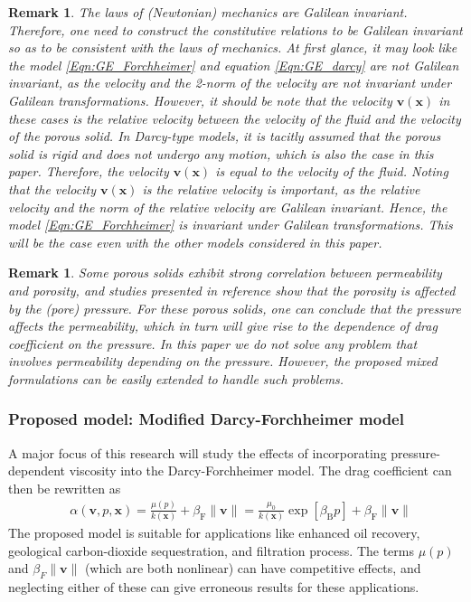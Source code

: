 \documentclass[11pt,reqno]{amsart}
\newtheorem{remark}[theorem]{Remark}
\begin{document}
\begin{remark}
  The laws of (Newtonian) mechanics are Galilean 
  invariant. Therefore, one need to construct the 
  constitutive relations to be Galilean invariant 
  so as to be consistent with the laws of mechanics. 
At first glance, it may look like the model 
  \eqref{Eqn:GE_Forchheimer} and equation 
  \eqref{Eqn:GE_darcy} are not Galilean invariant, 
  as the velocity and the 2-norm of the velocity 
  are not invariant under Galilean transformations. 
However, it should be note that the velocity 
  $\mathbf{v}(\mathbf{x})$ in these cases is 
  the relative velocity between the velocity 
  of the fluid and the velocity of the porous 
  solid. In Darcy-type models, it is tacitly 
  assumed that the porous solid is rigid and 
  does not undergo any motion, which is also 
  the case in this paper. Therefore, the 
  velocity $\mathbf{v}(\mathbf{x})$ is 
  equal to the velocity of the fluid. 
Noting that the velocity $\mathbf{v}(\mathbf{x})$ 
  is the relative velocity is important, as the 
  relative velocity and the norm of the relative 
  velocity are Galilean invariant. Hence, the model 
  \eqref{Eqn:GE_Forchheimer} is invariant under 
  Galilean transformations. This will be the case 
  even with the other models considered in this 
  paper.
\end{remark}

\begin{remark}
  Some porous solids exhibit strong correlation between 
  permeability and porosity, and studies presented in 
  reference \cite{PhysRevA.46.7680} show that the 
  porosity is affected by the (pore) pressure. For 
  these porous solids, one can conclude that the 
  pressure affects the permeability, which in turn 
  will give rise to the dependence of drag coefficient 
  on the pressure. In this paper we do not solve any 
  problem that involves permeability depending on the 
  pressure. However, the proposed mixed formulations 
  can be easily extended to handle such problems. 
\end{remark}

\subsubsection{Proposed model: Modified Darcy-Forchheimer model}
A major focus of this research will study the effects 
of incorporating pressure-dependent viscosity into 
the Darcy-Forchheimer model. The drag coefficient 
can then be rewritten as
\begin{align}
  \label{Eqn:GE_ModifiedForchheimer}
  &\alpha(\mathbf{v},p,\mathbf{x}) =  \frac{\mu(p)}{k(\mathbf{x})} 
  + \beta_{\mathrm{F}}\|\mathbf{v}\| = \frac{\mu_0}{k(\mathbf{x})} 
  \exp[\beta_{\mathrm{B}} p] + \beta_{\mathrm{F}} \|\mathbf{v}\| 
\end{align}
The proposed model is suitable for applications like 
enhanced oil recovery, geological carbon-dioxide 
sequestration, and filtration process. The terms $\mu(p)$ 
and $\beta_{F} \|\mathbf{v}\|$ (which are both nonlinear) 
can have competitive effects, and neglecting either of 
these can give erroneous results for these applications. 
\end{document}
